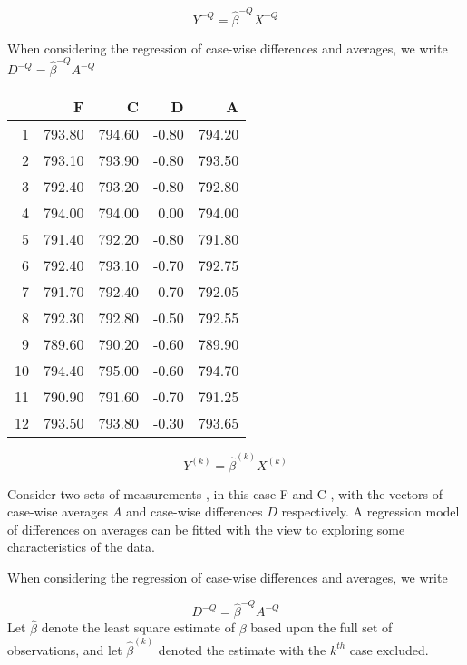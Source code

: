 \documentclass[12pt, a4paper]{article}
\begin{document}
\begin{equation}
Y^{-Q} = \hat{\beta}^{-Q}X^{-Q}
\end{equation}

When considering the regression of case-wise differences and averages, we write $D^{-Q} = \hat{\beta}^{-Q}A^{-Q}$


\begin{table}[ht]
	\begin{center}
		\begin{tabular}{rrrrr}
			\hline
			& F & C & D & A \\
			\hline
			1 & 793.80 & 794.60 & -0.80 & 794.20 \\
			2 & 793.10 & 793.90 & -0.80 & 793.50 \\
			3 & 792.40 & 793.20 & -0.80 & 792.80 \\
			4 & 794.00 & 794.00 & 0.00 & 794.00 \\
			5 & 791.40 & 792.20 & -0.80 & 791.80 \\
			6 & 792.40 & 793.10 & -0.70 & 792.75 \\
			7 & 791.70 & 792.40 & -0.70 & 792.05 \\
			8 & 792.30 & 792.80 & -0.50 & 792.55 \\
			9 & 789.60 & 790.20 & -0.60 & 789.90 \\
			10 & 794.40 & 795.00 & -0.60 & 794.70 \\
			11 & 790.90 & 791.60 & -0.70 & 791.25 \\
			12 & 793.50 & 793.80 & -0.30 & 793.65 \\
			\hline
		\end{tabular}
	\end{center}
\end{table}


\newpage

\begin{equation}
Y^{(k)} = \hat{\beta}^{(k)}X^{(k)}
\end{equation}

Consider two sets of measurements , in this case F and C , with the vectors of case-wise averages $A$ and case-wise differences $D$ respectively. A regression model of differences on averages can be fitted with the view to exploring some characteristics of the data.

When considering the regression of case-wise differences and averages, we write

\begin{equation}
D^{-Q} = \hat{\beta}^{-Q}A^{-Q}
\end{equation}
Let $\hat{\beta}$ denote the least square estimate of $\beta$ based upon the full set of observations, and let $\hat{\beta}^{(k)}$ denoted the estimate with the $k^{th}$ case excluded.
\end{document}
